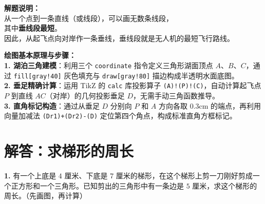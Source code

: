 \vspace{0.6cm}

{\small\color{gray}
\textbf{解题说明：}\\
从一个点到一条直线（或线段），可以画无数条线段，\\
其中\textbf{垂线段最短}。\\
因此，从起飞点向对岸作一条垂线，垂线段就是无人机的最短飞行路线。
}

\vspace{0.6cm}

{\small\color{blue!70!black}
\textbf{绘图基本原理与步骤：}\\
\textbf{1. 湖泊三角建模}：利用三个 \texttt{coordinate} 指令定义三角形湖面顶点 $A$、$B$、$C$，通过 \texttt{fill[gray!40]} 灰色填充与 \texttt{draw[gray!80]} 描边构成半透明水面底图。\\
\textbf{2. 垂足精确计算}：运用 TikZ 的 \texttt{calc} 库投影算子 \texttt{(A)!(P)!(C)}，自动计算起飞点 $P$ 到直线 $AC$（对岸）的几何投影垂足 $D$，无需手动三角函数推导。\\
\textbf{3. 直角标记构造}：通过从垂足 $D$ 分别向 $P$ 和 $A$ 方向各取 0.3cm 的端点，再利用向量加减法 \texttt{(Dr1)+(Dr2)-(D)} 定位第四个角点，构成标准直角方框标记。
}


\newpage




\newpage

\section{解答：求梯形的周长}

\vspace{0.4cm}

\noindent\textbf{1.} 有一个上底是 $4$ 厘米、下底是 $7$ 厘米的梯形，在这个梯形上剪一刀刚好剪成一个正方形和一个三角形。已知剪出的三角形中有一条边是 $5$ 厘米，求这个梯形的周长。（先画图，再计算）

\vspace{0.8cm}

